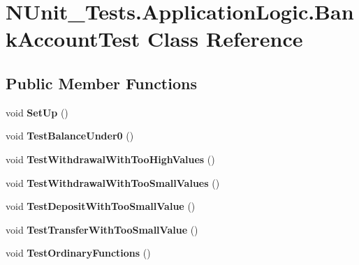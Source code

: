 \hypertarget{class_n_unit___tests_1_1_application_logic_1_1_bank_account_test}{
\section{NUnit\_\-Tests.ApplicationLogic.BankAccountTest Class Reference}
\label{class_n_unit___tests_1_1_application_logic_1_1_bank_account_test}
}
\subsection*{Public Member Functions}
\begin{DoxyCompactItemize}
\item 
\hypertarget{class_n_unit___tests_1_1_application_logic_1_1_bank_account_test_a0133ba8513a90aa535a95bf8f9f424b9}{
void {\bfseries SetUp} ()}
\label{class_n_unit___tests_1_1_application_logic_1_1_bank_account_test_a0133ba8513a90aa535a95bf8f9f424b9}

\item 
\hypertarget{class_n_unit___tests_1_1_application_logic_1_1_bank_account_test_a0e7b798ff62d547b700f4328e870c25c}{
void {\bfseries TestBalanceUnder0} ()}
\label{class_n_unit___tests_1_1_application_logic_1_1_bank_account_test_a0e7b798ff62d547b700f4328e870c25c}

\item 
\hypertarget{class_n_unit___tests_1_1_application_logic_1_1_bank_account_test_ac2b38a9e2090a850a20e1e0ea704fb7a}{
void {\bfseries TestWithdrawalWithTooHighValues} ()}
\label{class_n_unit___tests_1_1_application_logic_1_1_bank_account_test_ac2b38a9e2090a850a20e1e0ea704fb7a}

\item 
\hypertarget{class_n_unit___tests_1_1_application_logic_1_1_bank_account_test_a63e8d1a3fdec25716d9f91908e6f8d2c}{
void {\bfseries TestWithdrawalWithTooSmallValues} ()}
\label{class_n_unit___tests_1_1_application_logic_1_1_bank_account_test_a63e8d1a3fdec25716d9f91908e6f8d2c}

\item 
\hypertarget{class_n_unit___tests_1_1_application_logic_1_1_bank_account_test_aea0a9ffcf361dcf67b131c674924211b}{
void {\bfseries TestDepositWithTooSmallValue} ()}
\label{class_n_unit___tests_1_1_application_logic_1_1_bank_account_test_aea0a9ffcf361dcf67b131c674924211b}

\item 
\hypertarget{class_n_unit___tests_1_1_application_logic_1_1_bank_account_test_a1f22f298bd4286ef32bb1cc136fe623b}{
void {\bfseries TestTransferWithTooSmallValue} ()}
\label{class_n_unit___tests_1_1_application_logic_1_1_bank_account_test_a1f22f298bd4286ef32bb1cc136fe623b}

\item 
\hypertarget{class_n_unit___tests_1_1_application_logic_1_1_bank_account_test_aa3b2e64298ea37adcb79fa23b09bee04}{
void {\bfseries TestOrdinaryFunctions} ()}
\label{class_n_unit___tests_1_1_application_logic_1_1_bank_account_test_aa3b2e64298ea37adcb79fa23b09bee04}

\end{DoxyCompactItemize}


